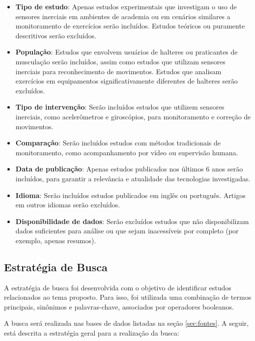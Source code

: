 \documentclass[a4paper,12pt]{article}
\begin{document}
\begin{itemize}
    \item \textbf{Tipo de estudo}: Apenas estudos experimentais que investigam o uso de sensores inerciais em ambientes de academia ou em cenários similares a monitoramento de exercícios serão incluídos. Estudos teóricos ou puramente descritivos serão excluídos.
    \item \textbf{População}: Estudos que envolvem usuários de halteres ou praticantes de musculação serão incluídos, assim como estudos que utilizam sensores inerciais para reconhecimento de movimentos. Estudos que analisam exercícios em equipamentos significativamente diferentes de halteres serão excluídos.
    \item \textbf{Tipo de intervenção}: Serão incluídos estudos que utilizem sensores inerciais, como acelerômetros e giroscópios, para monitoramento e correção de movimentos.
    \item \textbf{Comparação}: Serão incluídos estudos com métodos tradicionais de monitoramento, como acompanhamento por vídeo ou supervisão humana.
    \item \textbf{Data de publicação}: Apenas estudos publicados nos últimos 6 anos serão incluídos, para garantir a relevância e atualidade das tecnologias investigadas.
    \item \textbf{Idioma}: Serão incluídos estudos publicados em inglês ou português. Artigos em outros idiomas serão excluídos.
    \item \textbf{Disponibilidade de dados}: Serão excluídos estudos que não disponibilizam dados suficientes para análise ou que sejam inacessíveis por completo (por exemplo, apenas resumos).
\end{itemize}

\subsection{Estratégia de Busca}
A estratégia de busca foi desenvolvida com o objetivo de identificar estudos relacionados ao tema proposto. Para isso, foi utilizada uma combinação de termos principais, sinônimos e palavras-chave, associados por operadores booleanos.

A busca será realizada nas bases de dados listadas na seção \ref{sec:fontes}. A seguir, está descrita a estratégia geral para a realização da busca:
\end{document}
